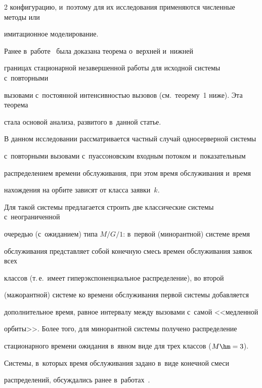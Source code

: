 \begin{multicols}{2}
конфигурацию, и~поэтому для их исследования применяются численные методы или 


имитационное моделирование.





Ранее в~работе~\cite{mathematics2022} была доказана тео\-ре\-ма о~верх\-ней и~ниж\-ней 


границах стационарной незавершенной работы  для исходной сис\-те\-мы с~повторными 


вызовами с~постоянной интенсивностью вызовов  (см.\ тео\-ре\-му~1 ниже). Эта тео\-ре\-ма 


стала основой анализа, развитого в~данной \mbox{статье}.





В данном исследовании рассматривается частный случай  односерверной сис\-те\-мы  


с~повторными вызовами с~пуассоновским входным потоком и~показательным 


распределением времени обслуживания, при этом  время обслуживания  и~время 


нахождения на орбите зависят от класса заявки~$k$.


%


Для такой системы предлагается строить две классические сис\-те\-мы с~неограниченной 


очередью (с~ожиданием) типа $M/G/1$: в~первой (минорантной) сис\-те\-ме время 


обслуживания пред\-став\-ля\-ет собой конечную смесь времен обслуживания заявок всех 


классов (т.\,е.\ имеет гиперэкспоненциальное распределение), во второй 


(мажорантной) сис\-те\-ме ко времени обслуживания первой сис\-те\-мы добавляется 


дополнительное время, равное  интервалу между вызовами  с~самой <<медленной 


орбиты>>.   Более того, для минорантной сис\-те\-мы получено распределение 


стационарного времени ожидания в~явном виде для трех классов ($M\hm=3$).


Сис\-те\-мы, в~которых  время обслуживания задано в~виде конечной смеси 


распределений, обсуждались ранее  в~работах~\cite{pesh-mor2022, pesh2022}.


 



\end{multicols}
